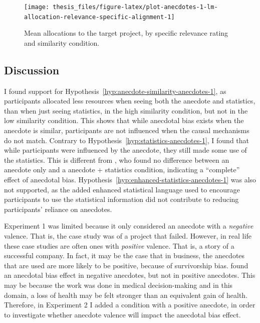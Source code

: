 \documentclass[a4paper, nobind, dvipsnames]{templates/ociamthesis}
\theoremstyle{definition}
\theoremstyle{definition}
\theoremstyle{definition}
\theoremstyle{definition}
\theoremstyle{remark}
\begin{document}
\begin{figure}
\texttt{[image: thesis\_files/figure-latex/plot-anecdotes-1-lm-allocation-relevance-specific-alignment-1]} \caption{Mean allocations to the target project, by specific relevance rating and similarity condition.}\label{fig:plot-anecdotes-1-lm-allocation-relevance-specific-alignment}
\end{figure}

\hypertarget{discussion-4}{%
\subsection{Discussion}\label{discussion-4}}

I found support for Hypothesis~\ref{hyp:anecdote-similarity-anecdotes-1}, as
participants allocated less resources when seeing both the anecdote and
statistics, than when just seeing statistics, in the high similarity condition,
but not in the low similarity condition. This shows that while anecdotal bias
exists when the anecdote is similar, participants are not influenced when the
causal mechanisms do not match. Contrary to
Hypothesis~\ref{hyp:statistics-anecdotes-1}, I found that while participants
were influenced by the anecdote, they still made some use of the statistics.
This is different from \textcite{wainberg2013}, who found no difference between an
anecdote only and a anecdote + statistics condition, indicating a ``complete''
effect of anecdotal bias. Hypothesis~\ref{hyp:enhanced-statistics-anecdotes-1}
was also not supported, as the added enhanced statistical language used to
encourage participants to use the statistical information did not contribute to
reducing participants' reliance on anecdotes.

Experiment 1 was limited because it only considered an anecdote with a
\emph{negative} valence. That is, the case study was of a project that failed.
However, in real life these case studies are often ones with \emph{positive} valence.
That is, a story of a successful company. In fact, it may be the case that in
business, the anecdotes that are used are more likely to be positive, because of
survivorship bias. \textcite{jaramillo2019} found an anecdotal bias effect in negative
anecdotes, but not in positive anecdotes. This may be because the work was done
in medical decision-making and in this domain, a loss of health may be felt
stronger than an equivalent gain of health. Therefore, in Experiment 2 I added a
condition with a positive anecdote, in order to investigate whether anecdote
valence will impact the anecdotal bias effect.
\end{document}

